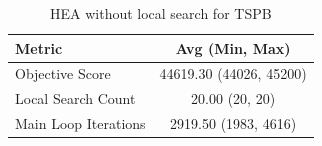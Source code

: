 \begin{table}[h!]
\centering
\begin{tabular}{lc}
\hline
Metric & Avg (Min, Max) \\
\hline
Objective Score & 44619.30 (44026, 45200) \\
Local Search Count & 20.00 (20, 20) \\
Main Loop Iterations & 2919.50 (1983, 4616) \\
\hline
\end{tabular}
\caption{HEA without local search for TSPB}
\label{tab:TSPB_hea_without_ls_scores}
\end{table}
